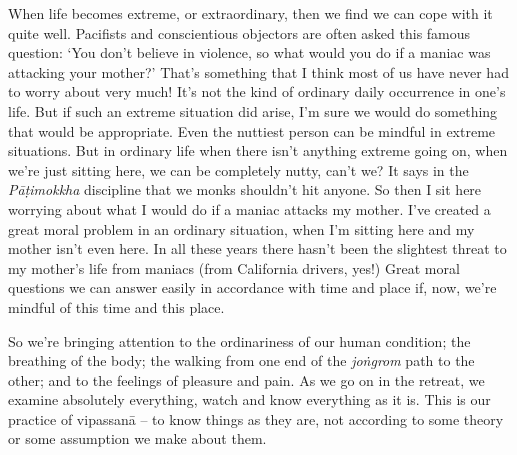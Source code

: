 When life becomes extreme, or extraordinary, then we find we can cope with it quite well. Pacifists and conscientious objectors are often asked this famous question: `You don't believe in violence, so what would you do if a maniac was attacking your mother?' That's something that I think most of us have never had to worry about very much! It's not the kind of ordinary daily occurrence in one's life. But if such an extreme situation did arise, I'm sure we would do something that would be appropriate. Even the nuttiest person can be mindful in extreme situations. But in ordinary life when there isn't anything extreme going on, when we're just sitting here, we can be completely nutty, can't we? It says in the \textit{Pāṭimokkha} discipline that we monks shouldn't hit anyone. So then I sit here worrying about what I would do if a maniac attacks my mother. I've created a great moral problem in an ordinary situation, when I'm sitting here and my mother isn't even here. In all these years there hasn't been the slightest threat to my mother's life from maniacs (from California drivers, yes!) Great moral questions we can answer easily in accordance with time and place if, now, we're mindful of this time and this place.

So we're bringing attention to the ordinariness of our human condition; the breathing of the body; the walking from one end of the \textit{joṅgrom} path to the other; and to the feelings of pleasure and pain. As we go on in the retreat, we examine absolutely everything, watch and know everything as it is. This is our practice of vipassanā -- to know things as they are, not according to some theory or some assumption we make about them.

